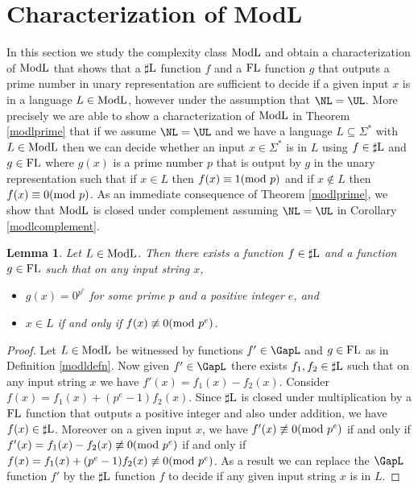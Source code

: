 \documentclass{amsbook}
\newtheorem{lemma}[theorem]{Lemma}
\theoremstyle{definition}
\theoremstyle{remark}
\numberwithin{section}{chapter}
\numberwithin{equation}{chapter}
\newcommand{\sharpL}{\mbox{$\sharp$\rm L}}
\newcommand{\ModL}{\mbox{\rm ModL}}
\newcommand{\boldModL}{\mbox{\rm \bf ModL}}
\newcommand{\FL}{\mbox{\rm FL}}
\renewcommand{\mod}{\mbox{\textrm mod~}}
\begin{document}
\section{Characterization of \textrm{\boldModL}}
In this section we study the complexity class $\ModL$ and obtain a characterization of $\ModL$ that shows that a $\sharpL$ function $f$ and a $\FL$ function $g$ that outputs a prime number in unary representation are
sufficient to decide if a given input $x$ is in a language $L\in
\ModL$, however under the assumption that $\NL =\UL$. More precisely we are able to show a characterization of $\ModL$ in Theorem \ref{modlprime} that if we assume $\NL =\UL$ and we have a language $L\subseteq\Sigma^{*}$ with $L\in\ModL$ then we can decide whether an input $x\in\Sigma^{*}$ is in $L$ using $f\in\sharpL$ and $g\in\FL$ where $g(x)$ is a prime number $p$ that is output by $g$ in the unary representation such that if $x\in L$ then $f(x)\equiv 1(\mod p)$ and if $x\not\in L$ then $f(x)\equiv 0(\mod p)$. As an immediate consequence of Theorem \ref{modlprime}, %
we show that $\ModL$ is closed under complement assuming $\NL =\UL$ in Corollary \ref{modlcomplement}.
\begin{lemma}\label{gapltosharpl}
  Let $L\in \ModL$. Then there exists a function $f\in \sharpL$ and a
  function $g\in \FL$ such that on any input string $x$,
  \begin{itemize}
  \item $g(x)=0^{p^e}$ for some prime $p$ and a positive integer $e$,
    and
  \item $x\in L$ if and only if $f(x)\not \equiv 0(\mod p^e)$.
  \end{itemize}
\end{lemma}
\begin{proof}
  Let $L\in \ModL$ be witnessed by functions $f'\in \GapL$ and $g\in
  \FL$ as in Definition \ref{modldefn}. Now given $f'\in \GapL$ there exists
  $f_1,f_2\in \sharpL$ such that on any input string $x$ we have
  $f'(x)=f_1(x)-f_2(x)$. Consider $f(x)=f_1(x)+(p^e-1)f_2(x)$. Since
  $\sharpL$ is closed under multiplication by a $\FL$ function that
  outputs a positive integer and also under addition, we have $f(x)\in \sharpL$. Moreover on a given
  input $x$, we have $f'(x)\not \equiv 0(\mod p^e)$ if and only if
  $f'(x)=f_1(x)-f_2(x)\not \equiv 0(\mod p^e)$ if and only if
  $f(x)=f_1(x)+(p^e-1)f_2(x)\not \equiv 0(\mod p^e)$. As a result we
  can replace the $\GapL$ function $f'$ by the $\sharpL$ function $f$
  to decide if any given input string $x$ is in $L$.
\end{proof}
\end{document}
